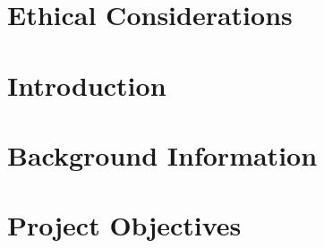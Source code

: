 \documentclass[12pt]{article}
\begin{document}
\pagebreak

\section*{Ethical Considerations}


\pagebreak

\tableofcontents

\pagebreak


\section{Introduction}


\section{Background Information}


\section{Project Objectives}



\newpage


\end{document}

